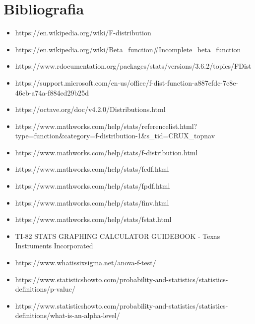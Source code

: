\documentclass{article}
\begin{document}
\section{Bibliografia}
\begin{itemize}
\item https://en.wikipedia.org/wiki/F-distribution
\item https://en.wikipedia.org/wiki/Beta\_function\#Incomplete\_beta\_function
\item https://www.rdocumentation.org/packages/stats/versions/3.6.2/topics/FDist
\item https://support.microsoft.com/en-us/office/f-dist-function-a887efdc-7c8e-46cb-a74a-f884cd29b25d
\item https://octave.org/doc/v4.2.0/Distributions.html
\item https://www.mathworks.com/help/stats/referencelist.html?type=function\&category=f-distribution-1\&s\_tid=CRUX\_topnav
\item https://www.mathworks.com/help/stats/f-distribution.html
\item https://www.mathworks.com/help/stats/fcdf.html
\item https://www.mathworks.com/help/stats/fpdf.html
\item https://www.mathworks.com/help/stats/finv.html
\item https://www.mathworks.com/help/stats/fstat.html
\item TI-82 STATS GRAPHING CALCULATOR GUIDEBOOK - Texas Instruments Incorporated
\item https://www.whatissixsigma.net/anova-f-test/
\item https://www.statisticshowto.com/probability-and-statistics/statistics-definitions/p-value/
\item https://www.statisticshowto.com/probability-and-statistics/statistics-definitions/what-is-an-alpha-level/
\end{itemize}
\end{document}
